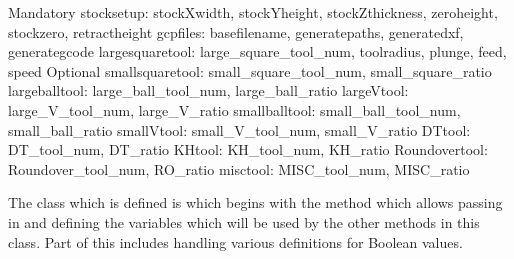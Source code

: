 \documentclass{ltxdoc}
\begin{document}
\begin{outline}
\1 Mandatory
   \2 stocksetup:
      \3 stockXwidth, stockYheight, stockZthickness, zeroheight, stockzero, retract\-height
   \2 gcpfiles: 
      \3 basefilename, generatepaths, generatedxf, generategcode
   \2 largesquaretool: 
      \3 large\_square\_tool\_num, toolradius, plunge, feed, speed
\1 Optional
   \2 smallsquaretool: 
      \3small\_square\_tool\_num, small\_square\_ratio
   \2 largeballtool: 
      \3 large\_ball\_tool\_num, large\_ball\_ratio
   \2 largeVtool: 
      \3 large\_V\_tool\_num, large\_V\_ratio
   \2 smallballtool: 
      \3 small\_ball\_tool\_num, small\_ball\_ratio
   \2 smallVtool: 
      \3 small\_V\_tool\_num, small\_V\_ratio
   \2 DTtool: 
      \3 DT\_tool\_num, DT\_ratio
   \2 KHtool: 
      \3 KH\_tool\_num, KH\_ratio
   \2 Roundovertool: 
      \3 Roundover\_tool\_num, RO\_ratio
   \2 misctool: 
      \3 MISC\_tool\_num, MISC\_ratio
\end{outline}

The class which is defined is  which begins with the  method which allows passing in and defining the variables which will be used by the other methods in this class. Part of this includes handling various definitions for Boolean values.
\end{document}

